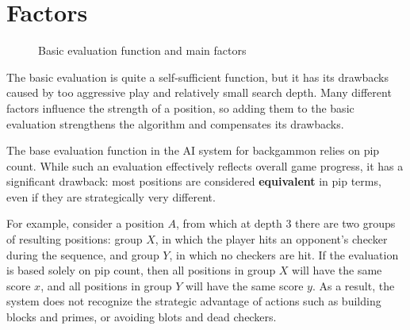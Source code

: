 \section{Factors}

\begin{figure}[H]
    \centering
    
\caption{Basic evaluation function and main factors}
\end{figure}

The basic evaluation is quite a self-sufficient function, but it has its drawbacks caused by too aggressive play and relatively small search depth. Many different factors influence the strength of a position, so adding them to the basic evaluation strengthens the algorithm and compensates its drawbacks.


The base evaluation function in the AI system for backgammon relies on pip count. While such an evaluation effectively reflects overall game progress, it has a significant drawback: most positions are considered \textbf{equivalent} in pip terms, even if they are strategically very different.

For example, consider a position $A$, from which at depth 3 there are two groups of resulting positions: group $X$, in which the player hits an opponent's checker during the sequence, and group $Y$, in which no checkers are hit. If the evaluation is based solely on pip count, then all positions in group $X$ will have the same score $x$, and all positions in group $Y$ will have the same score $y$. As a result, the system does not recognize the strategic advantage of actions such as building blocks and primes, or avoiding blots and dead checkers.

